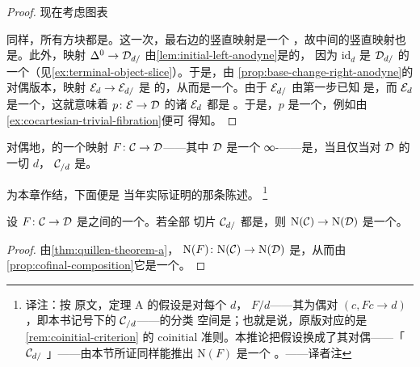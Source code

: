 \begin{proof}
现在考虑图表
\begin{center}
\end{center}
同样，所有方块都是\trPullback{}。这一次，最右边的竖直映射是一个%
\trRightFibration{}，故中间的竖直映射也是\trRightFibration{}。此外，映射
$\Delta^0 \to \mathcal{D}_{d/}$ 由\cref{lem:initial-left-anodyne}是\trLeftAnodyne{}的，
因为 $\mathrm{id}_d$ 是
$\mathcal{D}_{d/}$ 的一个\trInitialObject{}（见\cref{ex:terminal-object-slice}）。于是，由%
\cref{prop:base-change-right-anodyne}的对偶版本，映射 $\mathcal{E}_d \to \mathcal{E}_{d/}$ 是%
\trLeftAnodyne{}的，从而是一个\trWeakEquivalence{}。由于 $\mathcal{E}_{d/}$ 由第一步已知
是\trWeaklyContractible{}，而 $\mathcal{E}_d$ 是一个\trInfinityGroupoid{}，这就意味着%
\trRightFibration{} $p\colon \mathcal{E} \to \mathcal{D}$ 的诸\trFibre{} $\mathcal{E}_d$ 都是%
\trContractible{}。于是，$p$ 是一个\trTrivialFibration{}，例如由\cref{ex:cocartesian-trivial-fibration}便可
得知。
\end{proof}

\begin{remark}\label{rem:coinitial-criterion}
对偶地，\trSimplicialSets{}的一个映射 $F\colon \mathcal{C} \to \mathcal{D}$——其中 $\mathcal{D}$ 是一个
∞-\trCategory{}——是\trCoinitial{}，当且仅当对 $\mathcal{D}$ 的一切\trObject{} $d$，
\trSimplicialSet{} $\mathcal{C}_{/d}$ 是\trWeaklyContractible{}。
\end{remark}

为本章作结，下面便是 \trQuillen{}当年实际证明的那条陈述。
\footnote{译注：按 \trQuillen{}原文，定理 A 的假设是对每个 $d$，\trSliceCategory{}%
$F/d$——其\trObject{}为偶对 $(c, Fc \to d)$，即本书记号下的 $\mathcal{C}_{/d}$——的分类
空间是\trContractible{}；也就是说，原版对应的是\cref{rem:coinitial-criterion}
的 coinitial 准则。本推论把假设换成了其对偶——「$\mathcal{C}_{d/}$
\trWeaklyContractible{}」——由本节所证同样能推出 $\mathrm{N}(F)$ 是一个%
\trWeakEquivalence{}。——译者注}

\begin{corollary}\label{cor:quillen-theorem-a-original}
设 $F\colon \mathcal{C} \to \mathcal{D}$ 是\trOrdinaryCategory{}之间的一个\trFunctor{}。若全部
切片 $\mathcal{C}_{d/}$ 都是\trWeaklyContractible{}，则\trFunctor{}%
$\mathrm{N}(\mathcal{C}) \to \mathrm{N}(\mathcal{D})$ 是一个\trWeakEquivalence{}。
\end{corollary}

\begin{proof}
由\cref{thm:quillen-theorem-a}，\trFunctor{}%
$\mathrm{N}(F)\colon \mathrm{N}(\mathcal{C}) \to \mathrm{N}(\mathcal{D})$ 是\trCofinal{}，从而由%
\cref{prop:cofinal-composition}它是一个\trWeakEquivalence{}。
\end{proof}
